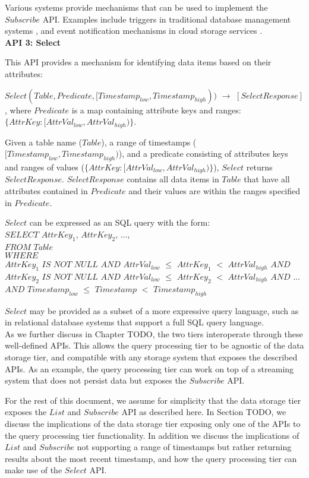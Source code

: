 Various systems provide mechanisms that can be used to implement the $Subscribe$ API.
Examples include triggers in traditional database management systems \cite{mariadb:triggers}, and event notification
mechanisms in cloud storage services \cite{awss3:notifications}.
\\

\noindent
\textbf{API 3: Select}

\noindent
This API provides a mechanism for identifying data items based on their attributes:

$Select(Table, Predicate, [Timestamp_{low}, Timestamp_{high}))$ $\rightarrow$ $[SelectResponse]$,
where $Predicate$ is a map containing attribute keys and ranges:
$\{AttrKey: [AttrVal_{low}, AttrVal_{high})\}$.

Given a table name ($Table$), a range of timestamps ($[Timestamp_{low}, Timestamp_{high})$), and
a predicate consisting of attributes keys and ranges of values
($\{AttrKey: [AttrVal_{low}, AttrVal_{high})\}$), $Select$ returns $SelectResponse$.
$SelectResponse$ contains all data items in $Table$ that have all attributes contained in $Predicate$ and
their values are within the ranges specified in $Predicate$.

$Select$ can be expressed as an SQL query with the form: \\
\noindent
$SELECT$ $AttrKey_1$, $AttrKey_2$, ..., \\
$FROM$ $Table$ \\
$WHERE$ \\
$AttrKey_1$ $IS$ $NOT$ $NULL$ $AND$ $AttrVal_{low}$ $\leq$ $AttrKey_1$ $<$ $AttrVal_{high}$
$AND$ $AttrKey_2$ $IS$ $NOT$ $NULL$ $AND$ $AttrVal_{low}$ $\leq$ $AttrKey_2$ $<$ $AttrVal_{high}$
$AND$ ... \\
$AND$ $Timestamp_{low}$ $\leq$ $Timestamp$ $<$ $Timestamp_{high}$

$Select$ may be provided as a subset of a more expressive query language, such as in relational database
systems that support a full SQL query language. \\

\noindent
As we further discuss in Chapter
TODO,
the two tiers interoperate through these well-defined APIs.
This allows the query processing tier to be agnostic of the data storage tier, and compatible with any storage system
that exposes the described APIs.
As an example, the query processing tier can work on top of a streaming system that does not persist data but exposes
the $Subscribe$ API.

For the rest of this document, we assume for simplicity that the data storage tier exposes the $List$ and $Subscribe$
API as described here.
In Section
TODO,
we discuss the implications of the data storage tier exposing only one of the APIs to the query processing tier
functionality.
In addition we discuss the implications of $List$ and $Subscribe$ not supporting a range of timestamps but rather
returning results about the most recent timestamp, and how the query processing tier can make use of the $Select$ API.

